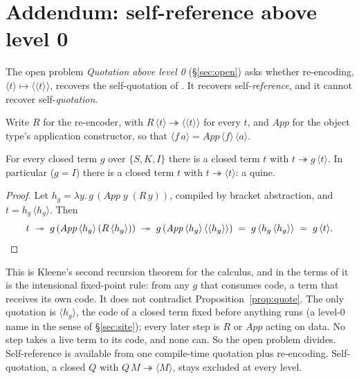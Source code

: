 
\section{Addendum: self-reference above level 0}\label{app:ifix}

The open problem \emph{Quotation above level 0} (\S\ref{sec:open}) asks whether
re-encoding, $\langle t\rangle \mapsto \langle\langle t\rangle\rangle$, recovers the
self-quotation of \citet{Jay2016,Jay2017}.  It recovers self-\emph{reference}, and
it cannot recover self-\emph{quotation}.

Write $R$ for the re-encoder, with $R\,\langle t\rangle \twoheadrightarrow
\langle\langle t\rangle\rangle$ for every $t$, and $\mathit{App}$ for the object
type's application constructor, so that $\langle f\,a\rangle = \mathit{App}\,
\langle f\rangle\,\langle a\rangle$.

\begin{proposition}\label{prop:ifix}
For every closed term $g$ over $\{S,K,I\}$ there is a closed term $t$ with
$t \twoheadrightarrow g\,\langle t\rangle$.  In particular ($g = I$) there is a
closed term $t$ with $t \twoheadrightarrow \langle t\rangle$: a quine.
\end{proposition}

\begin{proof}
Let $h_g = \lambda y.\, g\,(\mathit{App}\;y\;(R\,y))$, compiled by bracket
abstraction, and $t = h_g\,\langle h_g\rangle$.  Then
\[
t \;\twoheadrightarrow\; g\,(\mathit{App}\,\langle h_g\rangle\,(R\,\langle h_g\rangle))
  \;\twoheadrightarrow\; g\,(\mathit{App}\,\langle h_g\rangle\,\langle\langle h_g\rangle\rangle)
  \;=\; g\,\langle h_g\,\langle h_g\rangle\rangle \;=\; g\,\langle t\rangle .
\qedhere\]
\end{proof}

This is Kleene's second recursion theorem for the calculus, and in the
terms of \citet{Kavvos2017} it is the intensional fixed-point rule: from any
$g$ that consumes code, a term that receives its own code.  It does not
contradict Proposition~\ref{prop:quote}.  The only quotation is
$\langle h_g\rangle$, the code of a closed term fixed before anything runs (a
level-0 name in the sense of \S\ref{sec:site}); every later step is $R$ or
$\mathit{App}$ acting on data.  No step takes a live term to its code, and none
can.  So the open problem divides.  Self-reference is available from one
compile-time quotation plus re-encoding.  Self-quotation, a closed $Q$ with
$Q\,M \twoheadrightarrow \langle M\rangle$, stays excluded at every level.


